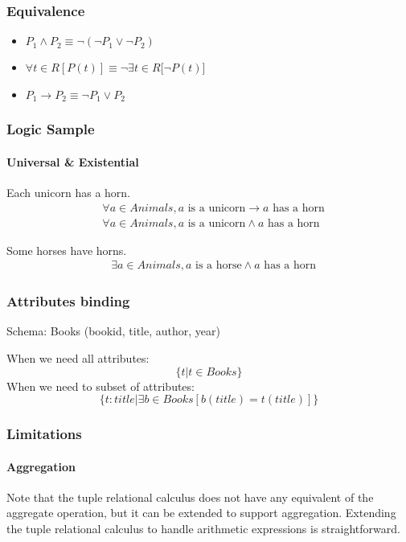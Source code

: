 \documentclass{beamer}
\begin{document}
\begin{frame}
  \frametitle{Equivalence}
  \begin{itemize}
  \item $P_1 \wedge P_2 \equiv \neg (\neg P_1 \vee \neg P_2)$
  \item $\forall t \in R[P(t)] \equiv \neg \exists t \in R [\neg P(t)$]
  \item $P_1 \rightarrow P_2 \equiv \neg P_1 \vee P_2$
  \end{itemize}
\end{frame}

\begin{frame}[fragile]
  \frametitle{Logic Sample}
  \framesubtitle{Universal \& Existential}
  Each unicorn has a horn. 
  \begin{align*}
  &\forall a \in Animals, a \text{ is a unicorn} \rightarrow a \text{ has a horn} \\
  &\forall a \in Animals, a \text{ is a unicorn} \wedge a \text{ has a horn}
  \end{align*}


  Some horses have horns. 
  \begin{align*}
  &\exists a \in Animals, a \text{ is a horse} \wedge a \text{ has a horn}
  \end{align*}
\end{frame}
\begin{frame}
  \frametitle{Attributes binding}
  Schema: Books (bookid, title, author, year)
  
  When we need all attributes:
  $$
  \{t|t\in Books\}
  $$
  When we need to subset of attributes:
  $$
  \{t:title| \exists b\in Books[b(title)=t(title)]\}
  $$
  
\end{frame}

\begin{frame}
  \frametitle{Limitations}
  \framesubtitle{Aggregation}
  Note that the tuple relational calculus does not have any equivalent of the aggregate
operation, but it can be extended to support aggregation. Extending the tuple relational
calculus to handle arithmetic expressions is straightforward.
\end{frame}
\end{document}

